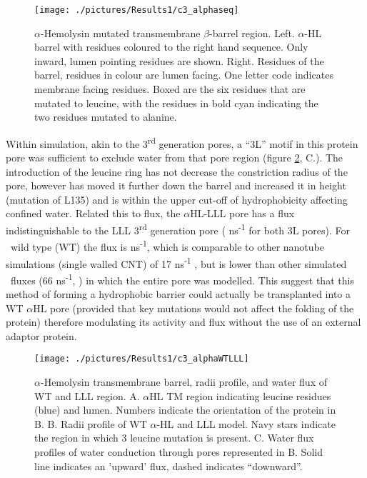\begin{figure}[H]
\begin{center}
\texttt{[image: ./pictures/Results1/c3\_alphaseq]}
\caption[$\alpha$-Hemolysin mutated transmembrane $\beta$-barrel region.] {$\alpha$-Hemolysin mutated transmembrane $\beta$-barrel region. Left. $\alpha$-HL barrel with residues coloured to the right hand sequence. Only inward, lumen pointing residues are shown. Right. Residues of the barrel, residues in colour are lumen facing. One letter code indicates membrane facing residues. Boxed are the six residues that are mutated to leucine, with the residues in bold cyan indicating the two residues mutated to alanine. }
\label{fig:c3_alphaseq}
\end{center}
\end{figure}

Within simulation, akin to the 3\textsuperscript{rd} generation pores, a ``3L'' motif in this protein pore was sufficient to exclude water from that pore region (figure \ref{fig:c3_alphaWTLLL}, C.). The introduction of the leucine ring has not decrease the constriction radius of the pore, however has moved it further down the barrel and increased it in height (mutation of L135) and is within the upper cut-off of hydrophobicity affecting confined water. Related this to flux, the $\alpha$HL-LLL pore has a flux indistinguishable to the LLL 3\textsuperscript{rd} generation pore ( ns\textsuperscript{-1} for both 3L pores). For \ahl\ wild type (WT) the flux is  ns\textsuperscript{-1}, which is comparable to other nanotube simulations (single walled CNT) of 17 ns\textsuperscript{-1} \cite{Hummer2001}, but is lower than other simulated \ahl\ fluxes (66 ns\textsuperscript{-1}, \cite{Wong-ekkabut2015}) in which the entire pore was modelled. This suggest that this method of forming a hydrophobic barrier could actually be transplanted into a WT $\alpha$HL pore (provided that key mutations would not affect the folding of the protein) therefore modulating its activity and flux without the use of an external adaptor protein. 


\begin{figure}[H]
\begin{center}
\texttt{[image: ./pictures/Results1/c3\_alphaWTLLL]}
\caption[$\alpha$-Hemolysin transmembrane barrel, radii profile, and water flux of WT and LLL region.] {$\alpha$-Hemolysin transmembrane barrel, radii profile, and water flux of WT and LLL region. A. $\alpha$HL TM region indicating leucine residues (blue) and lumen. Numbers indicate the orientation of the protein in B. B. Radii profile of WT $\alpha$-HL and LLL model. Navy stars indicate the region in which 3 leucine mutation is present. C. Water flux profiles of water conduction through pores represented in B. Solid line indicates an 'upward' flux, dashed indicates ``downward''. }
\label{fig:c3_alphaWTLLL}
\end{center}
\end{figure}

